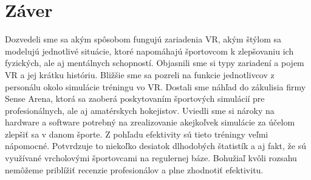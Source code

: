 \documentclass[10pt,twoside,slovak,a4paper]{article}										%
\begin{document}
\section{Záver} \label{zaver}
Dozvedeli sme sa akým spôsobom fungujú zariadenia VR, akým štýlom sa modelujú jednotlivé situácie, ktoré napomáhajú športovcom k zlepšovaniu ich fyzických, ale aj mentálnych schopností. Objasnili sme si typy zariadení a pojem VR a jej krátku históriu. Bližšie sme sa pozreli na funkcie jednotlivcov z personálu okolo simulácie tréningu vo VR. Dostali sme náhľad do zákulisia firmy Sense Arena, ktorá sa zaoberá poskytovaním športových simulácií pre profesionálnych, ale aj amatérskych hokejistov. Uviedli sme si nároky na hardware a software potrebný na zrealizovanie akejkoľvek simulácie za účelom zlepšiť sa v danom športe. Z pohľadu efektivity sú tieto tréningy veľmi nápomocné. Potvrdzuje to niekoľko desiatok dlhodobých štatistík a aj fakt, že sú využívané vrcholovými športovcami na regulernej báze. Bohužiaľ kvôli rozsahu nemôžeme priblížiť recenzie profesionálov a plne zhodnotiť efektivitu.

 
\end{document}
